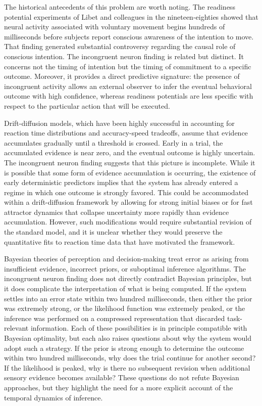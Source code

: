 \documentclass[11pt]{article}
\begin{document}
The historical antecedents of this problem are worth noting. The readiness potential experiments of Libet and colleagues in the nineteen-eighties showed that neural activity associated with voluntary movement begins hundreds of milliseconds before subjects report conscious awareness of the intention to move. That finding generated substantial controversy regarding the causal role of conscious intention. The incongruent neuron finding is related but distinct. It concerns not the timing of intention but the timing of commitment to a specific outcome. Moreover, it provides a direct predictive signature: the presence of incongruent activity allows an external observer to infer the eventual behavioral outcome with high confidence, whereas readiness potentials are less specific with respect to the particular action that will be executed.

Drift-diffusion models, which have been highly successful in accounting for reaction time distributions and accuracy-speed tradeoffs, assume that evidence accumulates gradually until a threshold is crossed. Early in a trial, the accumulated evidence is near zero, and the eventual outcome is highly uncertain. The incongruent neuron finding suggests that this picture is incomplete. While it is possible that some form of evidence accumulation is occurring, the existence of early deterministic predictors implies that the system has already entered a regime in which one outcome is strongly favored. This could be accommodated within a drift-diffusion framework by allowing for strong initial biases or for fast attractor dynamics that collapse uncertainty more rapidly than evidence accumulation. However, such modifications would require substantial revision of the standard model, and it is unclear whether they would preserve the quantitative fits to reaction time data that have motivated the framework.

Bayesian theories of perception and decision-making treat error as arising from insufficient evidence, incorrect priors, or suboptimal inference algorithms. The incongruent neuron finding does not directly contradict Bayesian principles, but it does complicate the interpretation of what is being computed. If the system settles into an error state within two hundred milliseconds, then either the prior was extremely strong, or the likelihood function was extremely peaked, or the inference was performed on a compressed representation that discarded task-relevant information. Each of these possibilities is in principle compatible with Bayesian optimality, but each also raises questions about why the system would adopt such a strategy. If the prior is strong enough to determine the outcome within two hundred milliseconds, why does the trial continue for another second? If the likelihood is peaked, why is there no subsequent revision when additional sensory evidence becomes available? These questions do not refute Bayesian approaches, but they highlight the need for a more explicit account of the temporal dynamics of inference.
\end{document}
